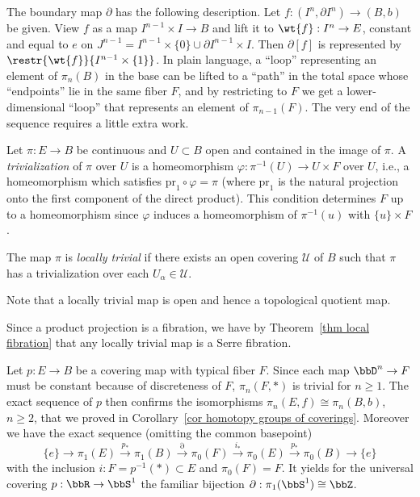 The boundary map $\partial$ has the following description. Let $f:(I^n,\partial I^n)\to (B,b)$ be given. View $f$ as a map $I^{n-1}\times I\to B$ and lift it to $\wt{f}:I^n\to E$, constant and equal to $e$ on $J^{n-1}=I^{n-1}\times \{0\}\cup \partial I^{n-1}\times I$. Then $\partial[f]$ is represented by $\restr{\wt{f}}{I^{n-1}\times \{1\}}$. In plain language, a ``loop'' representing an element of $\pi_n(B)$ in the base can be lifted to a ``path'' in the total space whose ``endpoints'' lie in the same fiber $F$, and by restricting to $F$ we get a lower-dimensional ``loop'' that represents an element of $\pi_{n-1}(F)$. The very end of the sequence requires a little extra work.

\begin{defn}[Trivialization]
    Let $\pi :E\to B$ be continuous and $U\subset B$ open and contained in the image of $\pi$. A \emph{trivialization} of $\pi$ over $U$ is a homeomorphism $\varphi:\pi^{-1}(U)\to U\times F$ over $U$, i.e., a homeomorphism which satisfies $\mathrm{pr}_1\circ \varphi=\pi$ (where $\mathrm{pr}_1$ is the natural projection onto the first component of the direct product). This condition determines $F$ up to a homeomorphism since $\varphi$ induces a homeomorphism of $\pi^{-1}(u)$ with $\{u\}\times F$.
\end{defn}

\begin{defn}
    The map $\pi$ is \emph{locally trivial} if there exists an open covering $\mathcal{U}$ of $B$ such that $\pi$ has a trivialization over each $U_\alpha\in \mathcal{U}$. 
\end{defn}

Note that a locally trivial map is open and hence a topological quotient map.

\begin{example}
    Since a product projection is a fibration, we have by Theorem~\ref{thm local fibration} that any locally trivial map is a Serre fibration.
\end{example}
\begin{example}
    Let $p:E\to B$ be a covering map with typical fiber $F$. Since each map $\bbD^n\to F$ must be constant because of discreteness of $F$, $\pi_n(F,*)$ is trivial for $n\geq 1$. The exact sequence of $p$ then confirms the isomorphisms $\pi_n(E,f)\cong \pi_n(B,b)$, $n\geq 2$, that we proved in Corollary~\ref{cor homotopy groups of coverings}. Moreover we have the exact sequence (omitting the common basepoint)
    \[\{e\}\to \pi_1(E)\overset{p_\ast}{\to} \pi_1(B)\overset{\partial}{\to} \pi_0(F)\overset{i_\ast}{\to} \pi_0(E)\overset{p_\ast}{\to} \pi_0(B)\to \{e\}\]
    with the inclusion $i:F=p^{-1}(*)\subset E$ and $\pi_0(F)=F$. It yields for the universal covering $p:\bbR \to \bbS^1$ the familiar bijection $\partial:\pi_1(\bbS^1)\cong \bbZ$.
\end{example}

